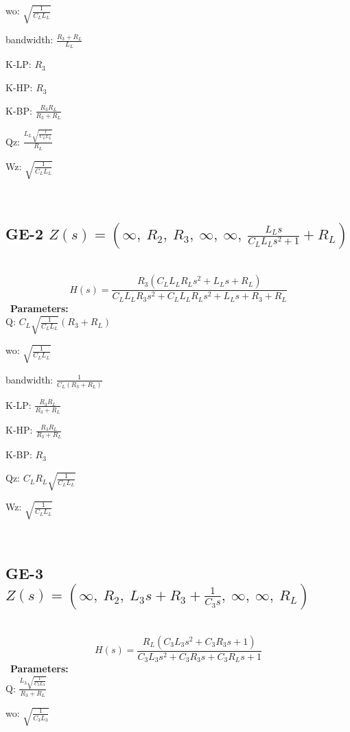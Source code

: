 \documentclass{article}
\begin{document}
wo: $\sqrt{\frac{1}{C_{L} L_{L}}}$\ 

bandwidth: $\frac{R_{3} + R_{L}}{L_{L}}$\ 

K-LP: $R_{3}$\ 

K-HP: $R_{3}$\ 

K-BP: $\frac{R_{3} R_{L}}{R_{3} + R_{L}}$\ 

Qz: $\frac{L_{L} \sqrt{\frac{1}{C_{L} L_{L}}}}{R_{L}}$\ 

Wz: $\sqrt{\frac{1}{C_{L} L_{L}}}$\ 

\ 

\subsection{GE-2 $Z(s) = \left( \infty, \  R_{2}, \  R_{3}, \  \infty, \  \infty, \  \frac{L_{L} s}{C_{L} L_{L} s^{2} + 1} + R_{L}\right)$ } \ 
\textbf{\[H(s) = \frac{R_{3} \left(C_{L} L_{L} R_{L} s^{2} + L_{L} s + R_{L}\right)}{C_{L} L_{L} R_{3} s^{2} + C_{L} L_{L} R_{L} s^{2} + L_{L} s + R_{3} + R_{L}}\] } \ 
\textbf{Parameters:}\\ 

Q: $C_{L} \sqrt{\frac{1}{C_{L} L_{L}}} \left(R_{3} + R_{L}\right)$\ 

wo: $\sqrt{\frac{1}{C_{L} L_{L}}}$\ 

bandwidth: $\frac{1}{C_{L} \left(R_{3} + R_{L}\right)}$\ 

K-LP: $\frac{R_{3} R_{L}}{R_{3} + R_{L}}$\ 

K-HP: $\frac{R_{3} R_{L}}{R_{3} + R_{L}}$\ 

K-BP: $R_{3}$\ 

Qz: $C_{L} R_{L} \sqrt{\frac{1}{C_{L} L_{L}}}$\ 

Wz: $\sqrt{\frac{1}{C_{L} L_{L}}}$\ 

\ 

\subsection{GE-3 $Z(s) = \left( \infty, \  R_{2}, \  L_{3} s + R_{3} + \frac{1}{C_{3} s}, \  \infty, \  \infty, \  R_{L}\right)$ } \ 
\textbf{\[H(s) = \frac{R_{L} \left(C_{3} L_{3} s^{2} + C_{3} R_{3} s + 1\right)}{C_{3} L_{3} s^{2} + C_{3} R_{3} s + C_{3} R_{L} s + 1}\] } \ 
\textbf{Parameters:}\\ 

Q: $\frac{L_{3} \sqrt{\frac{1}{C_{3} L_{3}}}}{R_{3} + R_{L}}$\ 

wo: $\sqrt{\frac{1}{C_{3} L_{3}}}$\ 
\end{document}
